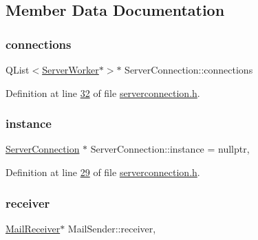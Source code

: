 \subsection{Member Data Documentation}
\mbox{\label{a00181_a7d9e1b1ac7c2d57b439ab5918e7c31d0}} 
\subsubsection{\texorpdfstring{connections}{connections}}
{\footnotesize\ttfamily Q\+List$<$\hyperlink{a00185}{Server\+Worker}$\ast$$>$$\ast$ Server\+Connection\+::connections\hspace{0.3cm}{\ttfamily [protected]}}



Definition at line \hyperlink{a00104_source_l00032}{32} of file \hyperlink{a00104_source}{serverconnection.\+h}.

\mbox{\label{a00181_adbbe8ffe6ee71b0aee4db9b6e689ba2a}} 
\subsubsection{\texorpdfstring{instance}{instance}}
{\footnotesize\ttfamily \hyperlink{a00181}{Server\+Connection} $\ast$ Server\+Connection\+::instance = nullptr\hspace{0.3cm}{\ttfamily [static]}, {\ttfamily [protected]}}



Definition at line \hyperlink{a00104_source_l00029}{29} of file \hyperlink{a00104_source}{serverconnection.\+h}.

\mbox{\label{a00205_aa57ce2f74f8ad76abb38974f85b97ac5}} 
\subsubsection{\texorpdfstring{receiver}{receiver}}
{\footnotesize\ttfamily \hyperlink{a00197}{Mail\+Receiver}$\ast$ Mail\+Sender\+::receiver\hspace{0.3cm}{\ttfamily [protected]}, {\ttfamily [inherited]}}



